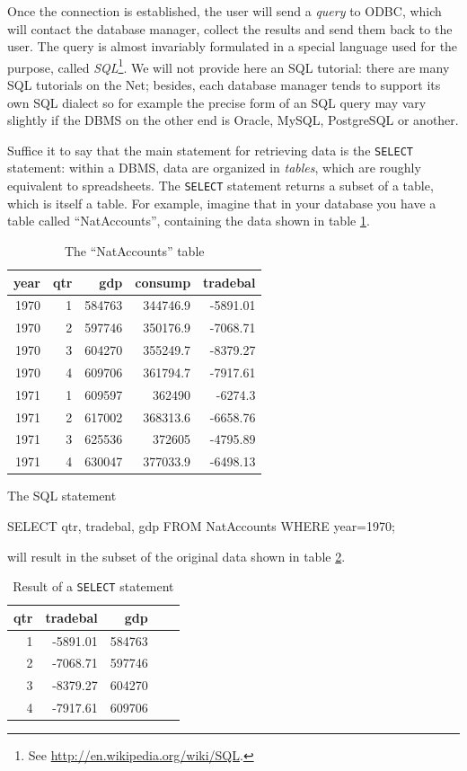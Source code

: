 Once the connection is established, the user will send a \emph{query}
to ODBC, which will contact the database manager, collect the results
and send them back to the user. The query is almost invariably
formulated in a special language used for the purpose, called
\emph{SQL}\footnote{See \url{http://en.wikipedia.org/wiki/SQL}.}. We
will not provide here an SQL tutorial: there are many SQL tutorials on
the Net; besides, each database manager tends to support its own SQL
dialect so for example the precise form of an SQL query may vary
slightly if the DBMS on the other end is Oracle, MySQL, PostgreSQL or
another.

Suffice it to say that the main statement for retrieving data is the
\texttt{SELECT} statement: within a DBMS, data are organized in
\emph{tables}, which are roughly equivalent to spreadsheets. The
\texttt{SELECT} statement returns a subset of a table, which is itself
a table. For example, imagine that in your database you have a table
called ``NatAccounts'', containing the data shown in table
\ref{tab:odbc-nataccounts}.

\begin{table}[htbp]
  \centering
  \begin{tabular}{rrrrr}
    \hline
    year	& qtr	& gdp	 & consump	& tradebal \\ 
    \hline
    1970	& 1	& 584763 & 344746.9	& -5891.01 \\ 
    1970	& 2	& 597746 & 350176.9	& -7068.71 \\ 
    1970	& 3	& 604270 & 355249.7	& -8379.27 \\ 
    1970	& 4	& 609706 & 361794.7	& -7917.61 \\ 
    1971	& 1	& 609597 & 362490	& -6274.3  \\ 
    1971	& 2	& 617002 & 368313.6	& -6658.76 \\ 
    1971	& 3	& 625536 & 372605	& -4795.89 \\ 
    1971	& 4	& 630047 & 377033.9	& -6498.13  
  \end{tabular}
  \caption{The ``NatAccounts'' table}
  \label{tab:odbc-nataccounts}
\end{table}

The SQL statement
\begin{code}
  SELECT qtr, tradebal, gdp FROM NatAccounts WHERE year=1970;
\end{code}
will result in the subset of the original data shown in table \ref{tab:odbc-result}.

\begin{table}[htbp]
  \centering
  \begin{tabular}{rrrrr}
    \hline
    qtr	& tradebal & gdp    \\ 
    \hline
    1	& -5891.01 & 584763 \\ 
    2	& -7068.71 & 597746 \\ 
    3	& -8379.27 & 604270 \\ 
    4	& -7917.61 & 609706  
  \end{tabular}
  \caption{Result of a \texttt{SELECT} statement}
  \label{tab:odbc-result}
\end{table}

